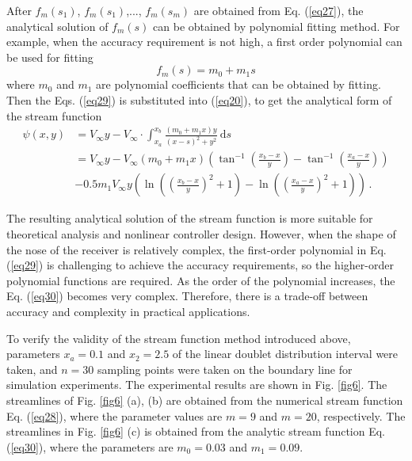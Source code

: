 After $f_m(s_1)$, $f_m(s_1)$,..., $f_m(s_m)$ are obtained from Eq. (\ref{eq27}), the analytical solution of $f_m(s)$ can be obtained by polynomial fitting method. For example, when the accuracy requirement is not high, a first order polynomial can be used for fitting
\begin{equation}\label{eq29}
f_m(s)=m_0+m_1 s
\end{equation}
where $m_0$ and $m_1$ are polynomial coefficients that can be obtained by fitting. Then the Eqs. (\ref{eq29}) is substituted into (\ref{eq20}), to get the analytical form of the stream function\\
\begin{equation}\label{eq30}
\begin{aligned}
\psi(x, y) & =V_{\infty} y-V_{\infty} \cdot \int_{x_a}^{x_b} \frac{\left(m_0+m_1 x\right) y}{(x-s)^2+y^2} \mathrm{~d} s \\
& =V_{\infty} y-V_{\infty}\left(m_0+m_1 x\right)\left(\tan ^{-1}\left(\frac{x_b-x}{y}\right)-\tan ^{-1}\left(\frac{x_a-x}{y}\right)\right) \\
& -0.5 m_1 V_{\infty} y\left(\ln \left(\left(\frac{x_b-x}{y}\right)^2+1\right)-\ln \left(\left(\frac{x_a-x}{y}\right)^2+1\right)\right) \, .
\end{aligned}
\end{equation}

The resulting analytical solution of the stream function is more suitable for theoretical analysis and nonlinear controller design. However, when the shape of the nose of the receiver is relatively complex, the first-order polynomial in Eq. (\ref{eq29}) is challenging to achieve the accuracy requirements, so the higher-order polynomial functions are required. As the order of the polynomial increases, the Eq. (\ref{eq30}) becomes very complex. Therefore, there is a trade-off between accuracy and complexity in practical applications.

To verify the validity of the stream function method introduced above, parameters $x_a=0.1$ and $x_2=2.5$ of the linear doublet distribution interval were taken, and $n=30$ sampling points were taken on the boundary line for simulation experiments. The experimental results are shown in Fig. \ref{fig6}. The streamlines of Fig. \ref{fig6} (a), (b) are obtained from the numerical stream function Eq. (\ref{eq28}), where the parameter values are $m=9$ and $m=20$, respectively. The streamlines in Fig. \ref{fig6} (c) is obtained from the analytic stream function Eq. (\ref{eq30}), where the parameters are $m_0=0.03$ and $m_1=0.09$.

